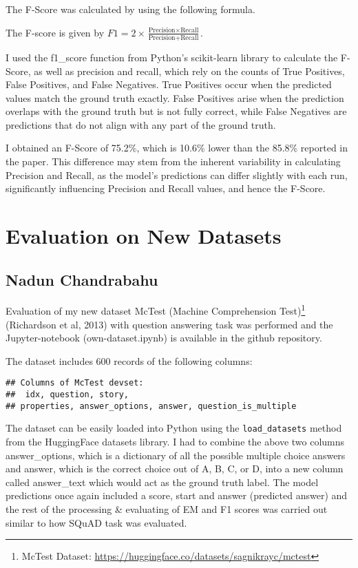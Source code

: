\documentclass[
  11pt,
]{article}
\begin{document}
The F-Score was calculated by using the following formula.

The F-score is given by
\(F1 = 2 \times \frac{\text{Precision} \times \text{Recall}}{\text{Precision} + \text{Recall}}\).

I used the f1\_score function from Python's scikit-learn library to
calculate the F-Score, as well as precision and recall, which rely on
the counts of True Positives, False Positives, and False Negatives. True
Positives occur when the predicted values match the ground truth
exactly. False Positives arise when the prediction overlaps with the
ground truth but is not fully correct, while False Negatives are
predictions that do not align with any part of the ground truth.

I obtained an F-Score of 75.2\%, which is 10.6\% lower than the 85.8\%
reported in the paper. This difference may stem from the inherent
variability in calculating Precision and Recall, as the model's
predictions can differ slightly with each run, significantly influencing
Precision and Recall values, and hence the F-Score.

\section{Evaluation on New Datasets}\label{evaluation-on-new-datasets}

\subsection{Nadun Chandrabahu}\label{nadun-chandrabahu}

Evaluation of my new dataset McTest (Machine Comprehension
Test)\footnote{McTest Dataset:
  \url{https://huggingface.co/datasets/sagnikrayc/mctest}} (Richardson
et al, 2013) with question answering task was performed and the
Jupyter-notebook (own-dataset.ipynb) is available in the github
repository.

The dataset includes 600 records of the following columns:

\begin{verbatim}
## Columns of McTest devset:
##  idx, question, story,
## properties, answer_options, answer, question_is_multiple
\end{verbatim}

The dataset can be easily loaded into Python using the
\texttt{load\_datasets} method from the HuggingFace datasets library. I
had to combine the above two columns answer\_options, which is a
dictionary of all the possible multiple choice answers and answer, which
is the correct choice out of A, B, C, or D, into a new column called
answer\_text which would act as the ground truth label. The model
predictions once again included a score, start and answer (predicted
answer) and the rest of the processing \& evaluating of EM and F1 scores
was carried out similar to how SQuAD task was evaluated.
\end{document}
